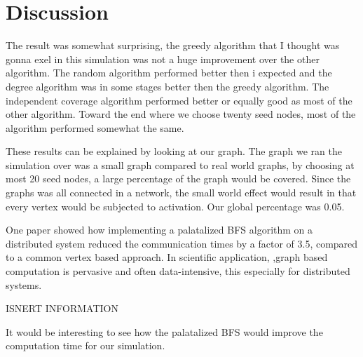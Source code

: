 \chapter{Discussion}
The result was somewhat surprising, the greedy algorithm that I thought was gonna exel in this simulation was not a huge improvement over the other algorithm. The random algorithm performed better then i expected and the degree algorithm was in some stages better then the greedy algorithm. The independent coverage algorithm performed better or equally good as most of the other algorithm. Toward the end where we choose twenty seed nodes, most of the algorithm performed somewhat the same.

These results can be explained by looking at our graph. The graph we ran the simulation over was a small graph compared to real world graphs, by choosing at most 20 seed nodes, a large percentage of the graph would be covered. Since the graphs was all connected in a network, the small world effect would result in that every vertex would be subjected to activation. Our global percentage was 0.05. 

One paper showed how implementing a palatalized BFS algorithm on a distributed system reduced the communication times by a factor of 3.5, compared to a common vertex based approach\cite{ParallelBFS2011}.  In scientific application, ,graph based computation is pervasive and often data-intensive, this especially for distributed systems. 

ISNERT INFORMATION 


It would be interesting to see how the palatalized BFS would improve the computation time for our simulation.